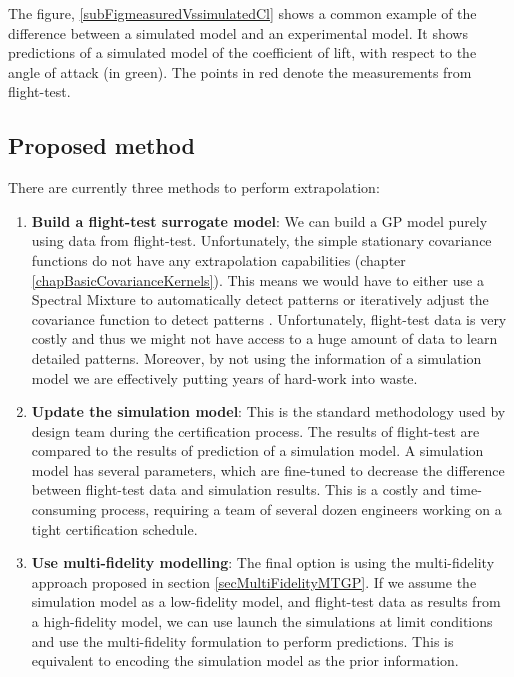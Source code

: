The figure, \ref{subFigmeasuredVssimulatedCl} shows a common example of the difference between a simulated model and an experimental model. It shows predictions of a simulated model of the coefficient of lift, with respect to the angle of attack (in green). The points in red denote the measurements from flight-test.  


\subsection{Proposed method}
There are currently three methods to perform extrapolation:
\begin{enumerate}
\item \textbf{Build a flight-test surrogate model}: We can build a GP model purely using data from flight-test. Unfortunately, the simple stationary covariance functions do not have any extrapolation capabilities (chapter \ref{chapBasicCovarianceKernels}). This means we would have to either use a Spectral Mixture to automatically detect patterns \cite{wilson2014thesis} or iteratively adjust the covariance function to detect patterns \cite{duvenaud-thesis-2014}. Unfortunately, flight-test data is very costly and thus we might not have access to a huge amount of data to learn detailed patterns. Moreover, by not using the information of a simulation model we are effectively putting years of hard-work into waste. 

\item \textbf{Update the simulation model}: This is the standard methodology used by design team during the certification process. The results of flight-test are compared to the results of prediction of a simulation model. A simulation model has several parameters, which are fine-tuned to decrease the difference between flight-test data and simulation results. This is a costly and time-consuming process, requiring a team of several dozen engineers working on a tight certification schedule. 

\item \textbf{Use multi-fidelity modelling}: The final option is using the multi-fidelity approach proposed in section \ref{secMultiFidelityMTGP}. If we assume the simulation model as a low-fidelity model, and flight-test data as results from a high-fidelity model, we can use launch the simulations at limit conditions and use the multi-fidelity formulation to perform predictions. This is equivalent to encoding the simulation model as the prior information. 
\end{enumerate}


